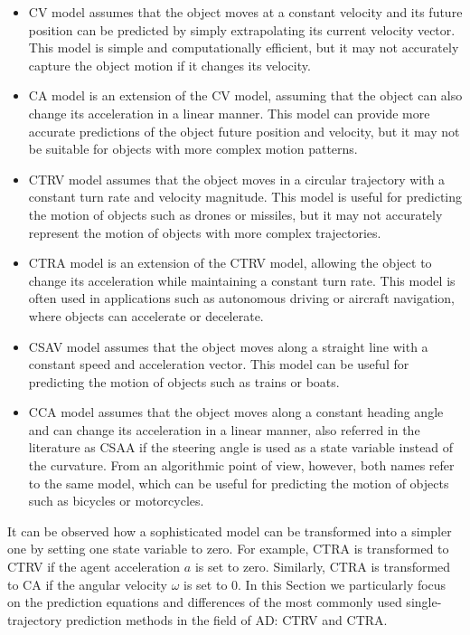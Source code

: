 \begin{itemize}
	
	\item \acf{CV} model assumes that the object moves at a constant velocity and its future position can be predicted by simply extrapolating its current velocity vector. This model is simple and computationally efficient, but it may not accurately capture the object motion if it changes its velocity.
	
	\item \acf{CA} model is an extension of the CV model, assuming that the object can also change its acceleration in a linear manner. This model can provide more accurate predictions of the object future position and velocity, but it may not be suitable for objects with more complex motion patterns.
	
	\item \acf{CTRV} model assumes that the object moves in a circular trajectory with a constant turn rate and velocity magnitude. This model is useful for predicting the motion of objects such as drones or missiles, but it may not accurately represent the motion of objects with more complex trajectories.
	
	\item \acf{CTRA} model is an extension of the \ac{CTRV} model, allowing the object to change its acceleration while maintaining a constant turn rate. This model is often used in applications such as autonomous driving or aircraft navigation, where objects can accelerate or decelerate.
	
	\item \acf{CSAV} model assumes that the object moves along a straight line with a constant speed and acceleration vector. This model can be useful for predicting the motion of objects such as trains or boats. 
	
	\item \acf{CCA} model assumes that the object moves along a constant heading angle and can change its acceleration in a linear manner, also referred in the literature as \acf{CSAA} if the steering angle is used as a state variable instead of the curvature. From an algorithmic point of view, however, both names refer to the same model, which can be useful for predicting the motion of objects such as bicycles or motorcycles.
	
\end{itemize}

It can be observed how a sophisticated model can be transformed into a simpler one by setting one state variable to zero. For example, \ac{CTRA} is transformed to \ac{CTRV} if the agent acceleration $a$ is set to zero. Similarly, \ac{CTRA} is transformed to CA if the angular velocity $\omega$ is set to 0. In this Section we particularly focus on the prediction equations and differences of the most commonly used single-trajectory prediction methods in the field of \ac{AD}: \ac{CTRV} and \ac{CTRA}.

